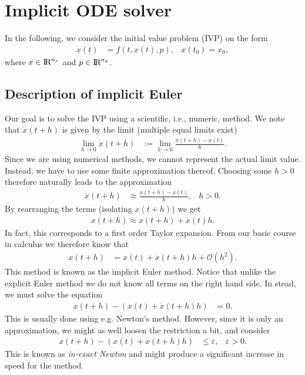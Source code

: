 \chapter{Implicit ODE solver}
In the following, we consider the initial value problem (IVP) on the form
\begin{align}
    \dot{x}(t) &= f(t,x(t),p), & x(t_0) = x_0,
\end{align}
where $x \in \text{I\kern-0.15em R} ^{n_x}$ and $p \in \text{I\kern-0.15em R} ^{n_p}$. 

\section{Description of implicit Euler}
Our goal is to solve the IVP using a scientific, i.e., numeric, method. We note that $\dot{x}(t+h)$ is given by the limit (multiple equal limits exist)
\begin{align}
    \lim_{h \rightarrow 0} \dot{x}(t+h) &:= \lim_{h \rightarrow 0} \frac{x(t+h)-x(t)}{h}.
\end{align}
Since we are using numerical methods, we cannot represent the actual limit value. Instead, we have to use some finite approximation thereof. Choosing some $h>0$ therefore naturally leads to the approximation
\begin{align}
    \dot{x}(t+h) &\approx \frac{x(t+h)-x(t)}{h}, &h>0.
\end{align}
By rearranging the terms (isolating $x(t+h)$) we get
\begin{align}
    x(t+h) \approx x(t+h) + \dot{x}(t) h.
\end{align}
In fact, this corresponds to a first order Taylor expansion. From our basic course in calculus we therefore know that
\begin{align}
    x(t+h) &= x(t) + \dot{x}(t+h) h + \mathcal{O}(h^2).
    \label{eq3:im_euler}
\end{align}
This method is known as the implicit Euler method. Notice that unlike the explicit Euler method we do not know all terms on the right hand side. In stead, we must solve the equation
\begin{align}
    x(t+h) - (x(t) + \dot{x}(t+h) h) &= 0.
\end{align}
This is usually done using e.g. Newton's method. However, since it is only an approximation, we might as well loosen the restriction a bit, and consider 
\begin{align}
    x(t+h) - (x(t) + \dot{x}(t+h) h) &\leq \varepsilon, & \varepsilon>0.
\end{align}
This is known as \textit{in-exact Newton} and might produce a significant increase in speed for the method. 

